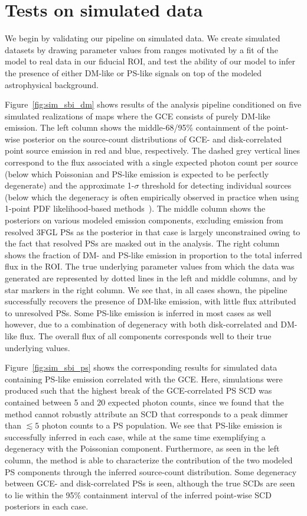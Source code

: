 \documentclass[prd,aps,10pt,nofootinbib,twocolumn,superscriptaddress,preprintnumbers,balancelastpage,longbibliography]{revtex4-1}
\begin{document}
\section{Tests on simulated data}
\label{sec:simulations}

We begin by validating our pipeline on simulated \Fermi data. We create simulated datasets by drawing parameter values from ranges motivated by a fit of the model to real \Fermi data in our fiducial ROI, and test the ability of our model to infer the presence of either DM-like or PS-like signals on top of the modeled astrophysical background.

Figure~\ref{fig:sim_sbi_dm} shows results of the analysis pipeline conditioned on five simulated realizations of maps where the GCE consists of purely DM-like emission. The left column shows the middle-68/95\% containment of the point-wise posterior on the source-count distributions of GCE- and disk-correlated point source emission in red and blue, respectively. The dashed grey vertical lines correspond to the flux associated with a single expected photon count per source (below which Poissonian and PS-like emission is expected to be perfectly degenerate) and the approximate 1-$\sigma$ threshold for detecting individual sources (below which the degeneracy is often empirically observed in practice when using 1-point PDF likelihood-based methods~\cite{Chang:2019ars,Buschmann:2020adf}). The middle column shows the posteriors on various modeled emission components, excluding emission from resolved 3FGL PSs as the posterior in that case is largely unconstrained owing to the fact that resolved PSs are masked out in the analysis. The right column shows the fraction of DM- and PS-like emission in proportion to the total inferred flux in the ROI. The true underlying parameter values from which the data was generated are represented by dotted lines in the left and middle columns, and by star markers in the right column. We see that, in all cases shown, the pipeline successfully recovers the presence of DM-like emission, with little flux attributed to unresolved PSs. Some PS-like emission is inferred in most cases as well however, due to a combination of degeneracy with both disk-correlated and DM-like flux. The overall flux of all components corresponds well to their true underlying values.

Figure~\ref{fig:sim_sbi_ps} shows the corresponding results for simulated data containing PS-like emission correlated with the GCE. Here, simulations were produced such that the highest break of the GCE-correlated PS SCD was contained between 5 and 20 expected photon counts, since we found that the method cannot robustly attribute an SCD that corresponds to a peak dimmer than $\lesssim5$ photon counts to a PS population. We see that PS-like emission is successfully inferred in each case, while at the same time exemplifying a degeneracy with the Poissonian component. Furthermore, as seen in the left column, the method is able to characterize the contribution of the two modeled PS components through the inferred source-count distribution. Some degeneracy between GCE- and disk-correlated PSs is seen, although the true SCDs are seen to lie within the 95\% containment interval of the inferred point-wise SCD posteriors in each case.
\end{document}
